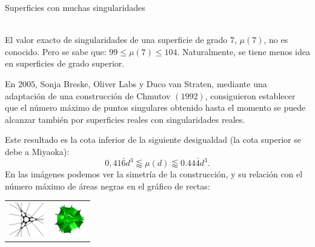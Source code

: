 \documentclass[es]{../../common/SurferDesc}%
\begin{document}
\footnotesize




\begin{surferPage}
  \begin{surferTitle}Superficies con muchas singularidades\end{surferTitle}   \\
    
    El valor exacto de singularidades de una superficie de grado $7$, $\mu(7)$, no es conocido.
    Pero se sabe que: $99\le \mu(7) \le 104$. Naturalmente, se tiene menos idea en superficies de grado superior.
    
    En $2005$, Sonja Breske, Oliver Labs y Duco van Straten, mediante una adaptación de 
    una construcción de Chmutov $(1992)$, consiguieron establecer que el número máximo de puntos singulares
    obtenido hasta el momento se puede alcanzar también por superficies reales con singularidades reales.
    
    Este resultado es la cota inferior de la siguiente desigualdad (la cota superior se debe a Miyaoka):
    \[0,41\bar{6}d^3 \lessapprox \mu(d) \lessapprox 0.44\bar{4} d^3.\]
     En las imágenes podemos ver la simetría de la construcción, y su relación
     con el número máximo de áreas negras en el gráfico de rectas:
    \begin{center}
      \begin{tabular}{c@{\qquad}c}
        \includegraphics[height=1.5cm]{../../common/images/vielesing.pdf}
        &
        \includegraphics[height=1.5cm]{../../common/images/p9surface_von_oben}
      \end{tabular}
    \end{center}

  \begin{surferText}
     \end{surferText}
\end{surferPage}
\end{document}
